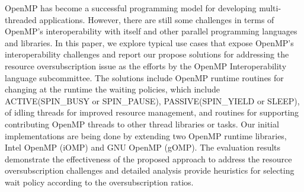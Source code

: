OpenMP has become a successful programming model
for developing multi-threaded applications.
However, there are still some challenges in terms of OpenMP's interoperability
with itself and other parallel programming languages and libraries.
In this paper, we explore typical use cases that expose OpenMP's interoperability challenges and
report our propose solutions for addressing the resource oversubscription issue as the efforts
by the OpenMP Interoperability language subcommittee. 
The solutions include OpenMP runtime routines for
changing at the runtime the waiting policies, which include ACTIVE(SPIN\_BUSY or SPIN\_PAUSE), 
PASSIVE(SPIN\_YIELD or SLEEP), 
of idling threads for improved resource management, and 
routines for supporting contributing OpenMP threads to other thread libraries or tasks. 
Our initial implementations are being done by extending two OpenMP runtime libraries, 
Intel OpenMP (iOMP) and GNU OpenMP (gOMP).
The evaluation results demonstrate the effectiveness of the proposed approach to address the resource 
oversubscription challenges and detailed analysis provide heuristics for selecting wait policy according
to the oversubscription ratios. 


